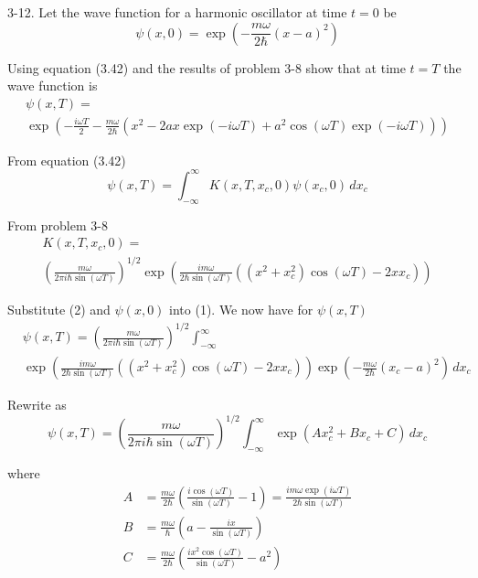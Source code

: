 \documentclass[12pt]{article}
\begin{document}
3-12.
Let the wave function for a harmonic oscillator at time $t=0$ be
\begin{equation*}
\psi(x,0)=\exp\left(-\frac{m\omega}{2\hbar}(x-a)^2\right)
\end{equation*}

Using equation (3.42) and the results of problem 3-8 show that
at time $t=T$ the wave function is
\begin{multline*}
\psi(x,T)=
\\
\exp\left(
-\frac{i\omega T}{2}-\frac{m\omega}{2\hbar}
\left(x^2-2ax\exp(-i\omega T)+a^2\cos(\omega T)\exp(-i\omega T)\right)
\right)
\end{multline*}

From equation (3.42)
\begin{equation*}
\psi(x,T)=\int_{-\infty}^\infty K(x,T,x_c,0)\psi(x_c,0)\,dx_c
\tag{1}
\end{equation*}

From problem 3-8
\begin{multline*}
K(x,T,x_c,0)=
\\
\left(\frac{m\omega}{2\pi i\hbar\sin(\omega T)}\right)^{1/2}
\exp\left(
\frac{im\omega}{2\hbar\sin(\omega T)}\left((x^2+x_c^2)\cos(\omega T)-2xx_c\right)
\right)
\tag{2}
\end{multline*}

Substitute (2) and $\psi(x,0)$ into (1).
We now have for $\psi(x,T)$
\begin{align*}
&\psi(x,T)=\left(\frac{m\omega}{2\pi i\hbar\sin(\omega T)}\right)^{1/2}
\int_{-\infty}^\infty
\\
&\exp\left(
\frac{im\omega}{2\hbar\sin(\omega T)}\left((x^2+x_c^2)\cos(\omega T)-2xx_c\right)
\right)
\exp\left(-\frac{m\omega}{2\hbar}(x_c-a)^2\right)\,dx_c
\end{align*}

Rewrite as
\begin{equation*}
\psi(x,T)=\left(\frac{m\omega}{2\pi i\hbar\sin(\omega T)}\right)^{1/2}
\int_{-\infty}^\infty\exp(Ax_c^2+Bx_c+C)\,dx_c
\tag{3}
\end{equation*}

where
\begin{align*}
A&=\frac{m\omega}{2\hbar}\left(\frac{i\cos(\omega T)}{\sin(\omega T)}-1\right)
=\frac{im\omega\exp(i\omega T)}{2\hbar\sin(\omega T)}
\\
B&=\frac{m\omega}{\hbar}\left(a-\frac{ix}{\sin(\omega T)}\right)
\\
C&=\frac{m\omega}{2\hbar}\left(\frac{ix^2\cos(\omega T)}{\sin(\omega T)}-a^2\right)
\end{align*}
\end{document}

